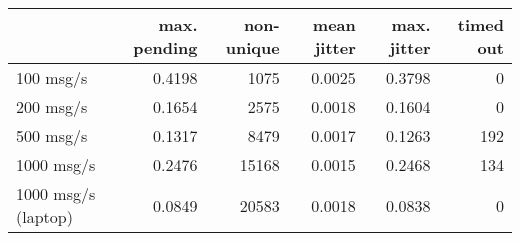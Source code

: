 \begin{tabular}{l|rrrrr}
\rowcolor{gray!50}
 & max. pending & non-unique & mean jitter & max. jitter & timed out\\\hline
100 msg/s & 0.4198 & 1075 & 0.0025 & 0.3798 & 0 \\
200 msg/s & 0.1654 & 2575 & 0.0018 & 0.1604 & 0 \\
500 msg/s & 0.1317 & 8479 & 0.0017 & 0.1263 & 192 \\
1000 msg/s & 0.2476 & 15168 & 0.0015 & 0.2468 & 134 \\
1000 msg/s (laptop) & 0.0849 & 20583 & 0.0018 & 0.0838 & 0 \\
\end{tabular}
